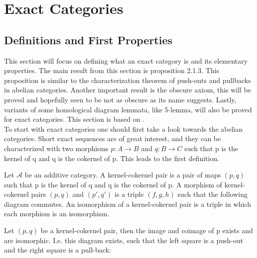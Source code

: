 \chapter{Exact Categories}

\section{Definitions and First Properties}

    This section will focus on defining what an exact category is and its elementary properties. The main result from this section is proposition 2.1.3. This proposition is similar to the characterization theorem of push-outs and pullbacks in abelian categories. Another important result is the obscure axiom, this will be proved and hopefully seen to be not as obscure as its name suggests. Lastly, variants of some homological diagram lemmata, like 5-lemma, will also be proved for exact categories. This section is based on \cite{buhler}. \\

    To start with exact categories one should first take a look towards the abelian categories. Short exact sequences are of great interest, and they can be characterized with two morphisms $p:A\rightarrow B$ and $q:B\rightarrow C$ such that p is the kernel of q and q is the cokernel of p. This leads to the first definition.

    \begin{definition}
        Let $\mathcal{A}$ be an additive category. A kernel-cokernel pair is a pair of maps $(p,q)$ such that p is the kernel of q and q is the cokernel of p. A morphism of kernel-cokernel pairs $(p,q)$ and $(p',q')$ is a triple $(f,g,h)$ such that the following diagram commutes. An isomorphism of a kernel-cokernel pair is a triple in which each morphism is an isomorphism.
        \begin{center}
        \end{center}
    \end{definition}

    \begin{lemma}
        Let $(p,q)$ be a kernel-cokernel pair, then the image and coimage of p exists and are isomorphic. I.e. this diagram exists, such that the left square is a push-out and the right square is a pull-back:
        \begin{center}
        \end{center}
    \end{lemma}
    
